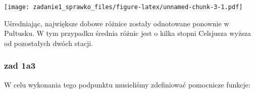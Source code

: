 \documentclass[
]{article}
\newenvironment{Shaded}{\begin{snugshade}}{\end{snugshade}}
\newcommand{\AttributeTok}[1]{\textcolor[rgb]{0.77,0.63,0.00}{#1}}
\newcommand{\FunctionTok}[1]{\textcolor[rgb]{0.00,0.00,0.00}{#1}}
\newcommand{\NormalTok}[1]{#1}
\newcommand{\OtherTok}[1]{\textcolor[rgb]{0.56,0.35,0.01}{#1}}
\newcommand{\SpecialCharTok}[1]{\textcolor[rgb]{0.00,0.00,0.00}{#1}}
\newcommand{\StringTok}[1]{\textcolor[rgb]{0.31,0.60,0.02}{#1}}
\begin{document}
\begin{Shaded}
\end{Shaded}

\texttt{[image: zadanie1\_sprawko\_files/figure-latex/unnamed-chunk-3-1.pdf]}

Uśredniając, największe dobowe różnice zostały odnotowane ponownie w
Pułtusku. W tym przypadku średnia różnic jest o kilka stopni Celsjusza
wyższa od pozostałych dwóch stacji.

\hypertarget{zad-1a3}{%
\subsubsection{zad 1a3}\label{zad-1a3}}

W celu wykonania tego podpunktu musieliśmy zdefiniować pomocnicze
funkcje:
\end{document}
